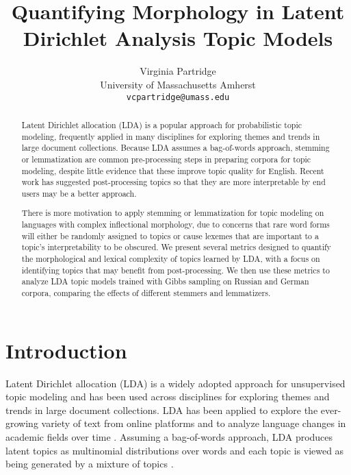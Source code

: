 \documentclass[11pt,a4paper]{article}
\title{Quantifying Morphology in Latent Dirichlet Analysis Topic Models}
\author{Virginia Partridge \\
  University of Massachusetts Amherst\\
  \texttt{vcpartridge@umass.edu}
}
\date{}
\begin{document}
\maketitle
\begin{abstract}
    Latent Dirichlet allocation (LDA) is a popular approach for probabilistic topic modeling, frequently applied in many disciplines for exploring themes and trends in large document collections. Because LDA assumes a bag-of-words approach, stemming or lemmatization are common pre-processing steps in preparing corpora for topic modeling, despite little evidence that these improve topic quality for English. Recent work has suggested post-processing topics so that they are more interpretable by end users may be a better approach.

    There is more motivation to apply stemming or lemmatization for topic modeling on languages with complex inflectional morphology, due to concerns that rare word forms will either be randomly assigned to topics or cause lexemes that are important to a topic's interpretability to be obscured.
    We present several metrics designed to quantify the morphological and lexical complexity of topics learned by LDA, with a focus on identifying topics that may benefit from post-processing. We then use these metrics to analyze LDA topic models trained with Gibbs sampling on Russian and German corpora, comparing the effects of different stemmers and lemmatizers.
\end{abstract}

\section{Introduction}
Latent Dirichlet allocation (LDA) is a widely adopted approach for unsupervised topic modeling and has been used across disciplines for exploring themes and trends in large document collections. LDA has been applied to explore the ever-growing variety of text from online platforms and to analyze language changes in academic fields over time \cite{koltsova2013,mcfarland2013differentiating, vogel-jurafsky-2012-said, mitrofanova2015probabilistic}. Assuming a bag-of-words approach, LDA produces latent topics as multinomial distributions over words and each topic is viewed as being generated by a mixture of topics \cite{blei2003,steyvers2007probabilistic}.
\end{document}
